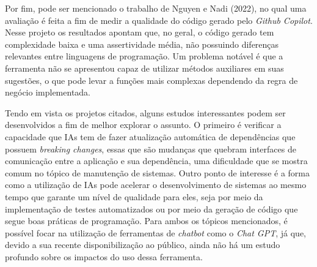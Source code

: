 Por fim, pode ser mencionado o trabalho de Nguyen e Nadi (2022)\nocite{copilot-quality-evaluation}, no qual uma avaliação é feita a fim de medir a qualidade do código gerado pelo \textit{Github Copilot}. Nesse projeto os resultados apontam que, no geral, o código gerado tem complexidade baixa e uma assertividade média, não possuindo diferenças relevantes entre linguagens de programação. Um problema notável é que a ferramenta não se apresentou capaz de utilizar métodos auxiliares em suas sugestões, o que pode levar a funções mais complexas dependendo da regra de negócio implementada.

Tendo em vista os projetos citados, alguns estudos interessantes podem ser desenvolvidos a fim de melhor explorar o assunto. O primeiro é verificar a capacidade que IAs tem de fazer atualização automática de dependências que possuem \textit{breaking changes}, essas que são mudanças que quebram interfaces de comunicação entre a aplicação e sua dependência, uma dificuldade que se mostra comum no tópico de manutenção de sistemas. Outro ponto de interesse é a forma como a utilização de IAs pode acelerar o desenvolvimento de sistemas ao mesmo tempo que garante um nível de qualidade para eles, seja por meio da implementação de testes automatizados ou por meio da geração de código que segue boas práticas de programação. Para ambos os tópicos mencionados, é possível focar na utilização de ferramentas de \textit{chatbot} como o \textit{Chat GPT}, já que, devido a sua recente disponibilização ao público, ainda não há um estudo profundo sobre os impactos do uso dessa ferramenta.
